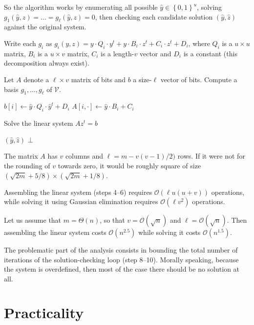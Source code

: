 \documentclass[a4paper]{article}
\newcommand{\bits}{\left\{0, 1\right\}}
\newcommand{\bigO}[1]{\ensuremath{\mathcal{O}\left( #1 \right)} }
\newcommand{\bigTheta}[1]{\ensuremath{\Theta\left( #1 \right)} }
\begin{document}
So the algorithm works by enumerating all possible $\hat y \in \bits^u$, solving
$g_1(\hat y, z) = \dots = g_\ell(\hat y, z) = 0$, then checking each candidate
solution $(\hat y, \hat z)$ against the original system.

Write each $g_i$ as
$g_i(y, z) = y \cdot Q_i \cdot y^t + y\cdot B_i \cdot z^t + C_i \cdot z^t +
D_i$, where $Q_i$ is a $u \times u$ matrix, $B_i$ is a $u \times v$ matrix,
$C_i$ is a length-$v$ vector and $D_i$ is a constant (this decomposition always
exist).

\begin{algorithm}
\begin{algorithmic}[1]
  \State Let $A$ denote a $\ell \times v$ matrix of bits and $b$ a size-$\ell$ vector of bits.
  \State Compute a basis $g_1, \dots, g_\ell$ of $\mathcal{V}$.
  \For{$\hat y \in \bits^u$}

  \State $b[i] \gets  \hat y \cdot Q_i \cdot \hat y^t + D_i$
  \State $A[i, \cdot] \gets \hat y \cdot B_i + C_i$
  \EndFor

  \State Solve the linear system $Az^t = b$

  \State \Return $(\hat y, \hat z)$
  \EndIf
  \EndFor
  \EndFor
  \State \Return $\bot$
\end{algorithmic}
\end{algorithm}

The matrix $A$ has $v$ columns and $\ell = m - v(v-1)/2)$ rows. If it were not
for the rounding of $v$ towards zero, it would be roughly square of size
$(\sqrt{2m} + 5/8) \times (\sqrt{2m} + 1/8)$.

Assembling the linear system (steps 4--6) requires $\bigO{\ell u(u+v)}$
operations, while solving it using Gaussian elimination requires $\bigO{\ell v^2}$ operations.

Let us assume that $m = \bigTheta{n}$, so that $v = \bigO{\sqrt{n}}$ and
$\ell = \bigO{\sqrt{n}}$. Then assembling the linear system costs
$\bigO{n^{2.5}}$ while solving it costs $\bigO{n^{1.5}}$.

The problematic part of the analysis consists in bounding the total number of
iterations of the solution-checking loop (step 8--10). Morally speaking, because
the system is overdefined, then most of the case there should be no solution at all.




\section{Practicality}
\end{document}
